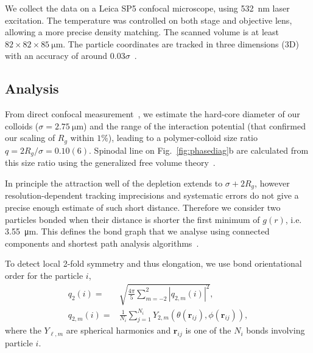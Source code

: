 We collect the data on a Leica SP5 confocal microscope, using \SI{532}{\nano\metre} laser excitation. The temperature was controlled on both stage and objective lens, allowing a more precise density matching. The scanned volume is at least $82 \times 82 \times \SI{85}{\micro\metre}$. The particle coordinates are tracked in three dimensions (3D) with an accuracy of around $0.03\sigma$~\cite{LeocmachColloids}.


\subsection*{Analysis}

From direct confocal measurement~\cite{Royall2007, Poon2012}, we estimate the hard-core diameter of our colloids ($\sigma=\SI{2.75}{\micro\metre}$) and the range of the interaction potential (that confirmed our scaling of $R_g$ within $1\%$), leading to a polymer-colloid size ratio $q = 2R_g/\sigma = 0.10(6)$. Spinodal line on Fig.~\ref{fig:phasediag}b are calculated from this size ratio using the generalized free volume theory~\cite{Fleer2008}.

In principle the attraction well of the depletion extends to $\sigma+2R_g$, however resolution-dependent tracking imprecisions and systematic errors do not give a precise enough estimate of such short distance. Therefore we consider two particles bonded when their distance is shorter the first minimum of $g(r)$, i.e. \SI{3.55}{\micro\metre}. This defines the bond graph that we analyse using connected components and shortest path analysis algorithms~\cite{Hagberg2008}.


To detect local 2-fold symmetry and thus elongation, we use \citet{steinhardt1983boo} bond orientational order for the particle $i$,
\begin{align}
	q_2(i) =& \sqrt{\frac{4\pi}{5} \sum_{m=-2}^{2} |q_{2,m}(i)|^2 }, \label{eq:ql}\\
	q_{2,m}(i) =& \frac{1}{N_i}\sum_{j=1}^{N_i} Y_{2,m}(\theta(\mathbf{r}_{ij}),\phi(\mathbf{r}_{ij})),
	\label{eq:qlm}
\end{align}
where the $Y_{\ell, m}$ are spherical harmonics and $\mathbf{r}_{ij}$ is one of the $N_i$ bonds involving particle $i$.



